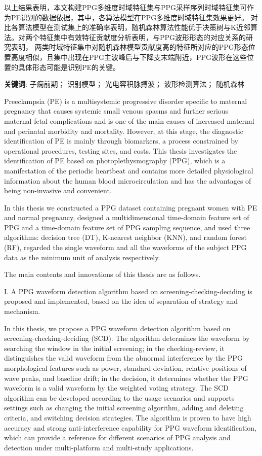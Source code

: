 以上结果表明，本文构建PPG多维度时域特征集与PPG采样序列时域特征集可作为PE识别的数据依据，其中，各算法模型在PPG多维度时域特征集效果更好。
对比各算法模型在测试集上的准确率表明，随机森林算法性能优于决策树与K近邻算法。对两个特征集中有效特征贡献度分析表明，与PPG波形形态的对应关系的研究表明，
两类时域特征集中对随机森林模型贡献度高的特征所对应的PPG形态位置高度相似，且集中出现在PPG主波峰后与下降支末端附近，PPG波形在这些位置的具体形态可能是识别PE的关键。

\vspace{2em}

\textbf{关键词}: 子痫前期； 识别模型； 光电容积脉搏波； 波形检测算法； 随机森林


\cleardoublepage
{}

Preeclampsia (PE) is a multisystemic progressive disorder specific to maternal pregnancy that causes systemic small venous spasms 
and further serious maternal-fetal complications and is one of the main causes of increased maternal and perinatal morbidity and mortality. 
However, at this stage, the diagnostic identification of PE is mainly through biomarkers, a process constrained by operational procedures, 
testing sites, and costs. 
This thesis investigates the identification of PE based on photoplethysmography (PPG), which is a manifestation of the periodic heartbeat and contains more 
detailed physiological information about the human blood microcirculation and has the advantages of being non-invasive and convenient.

In this thesis we constructed a PPG dataset containing pregnant women with PE and normal pregnancy, designed a multidimensional time-domain feature set of PPG and 
a time-domain feature set of PPG sampling sequence, and used three algorithms: decision tree (DT), K-nearest neighbor (KNN), and random forest (RF), 
regarded the single waveform and all the waveforms of the subject PPG data as the minimum unit of analysis respectively.

The main contents and innovations of this thesis are as follows.

I. A PPG waveform detection algorithm based on screening-checking-deciding is proposed and implemented, based on the idea of separation of strategy and mechanism.

In this thesis, we propose a PPG waveform detection algorithm based on screening-checking-deciding (SCD). The algorithm determines the waveform by searching the window 
in the initial screening; in the checking-review, it distinguishes the valid waveform from the abnormal interference by the PPG morphological features such as power, standard deviation, 
relative positions of wave peaks, and baseline drift; in the decision, it determines whether the PPG waveform is a valid waveform by the weighted voting strategy. 
The SCD algorithm can be developed according to the usage scenarios and supports settings such as changing the initial screening algorithm, adding and deleting criteria, 
and switching decision strategies. The algorithm is proven to have high accuracy and strong anti-interference capability for PPG waveform identification, 
which can provide a reference for different scenarios of PPG analysis and detection under multi-platform and multi-study applications.

